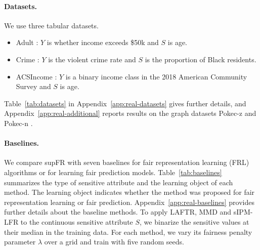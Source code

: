 \documentclass{article} %
\begin{document}
\paragraph{Datasets.}  We use three tabular datasets.
\begin{itemize}[leftmargin=*, itemsep=0pt, topsep=2pt]
  \item Adult \citep{adult_2}: $Y$ is whether income exceeds \$50k and $S$ is age.
  \item Crime \citep{communities_and_crime_183}: $Y$ is the violent crime rate and $S$ is the proportion of Black residents.
  \item ACSIncome \citep{ding2021retiring}: $Y$ is a binary income class in the 2018 American Community Survey and $S$ is age.
\end{itemize}
Table~\ref{tab:datasets} in Appendix~\ref{app:real-datasets} gives further details, and Appendix~\ref{app:real-additional} reports results on the graph datasets Pokec-z and Pokec-n \citep{takac2012data}.

\paragraph{Baselines.}
We compare supFR with seven baselines for fair representation learning (FRL) algorithms or for learning fair prediction models.
Table~\ref{tab:baselines} summarizes the type of sensitive attribute
and the learning object of each method. The learning object indicates
whether the method was proposed for fair representation learning or
fair prediction. Appendix~\ref{app:real-baselines} provides further
details about the baseline methods.
To apply LAFTR, MMD and sIPM-LFR to the continuous sensitive attribute $S$, we binarize the sensitive values at their median in the training data.
For each method, we vary its fairness penalty parameter $\lambda$ over a grid and train with five random seeds.
\end{document}
